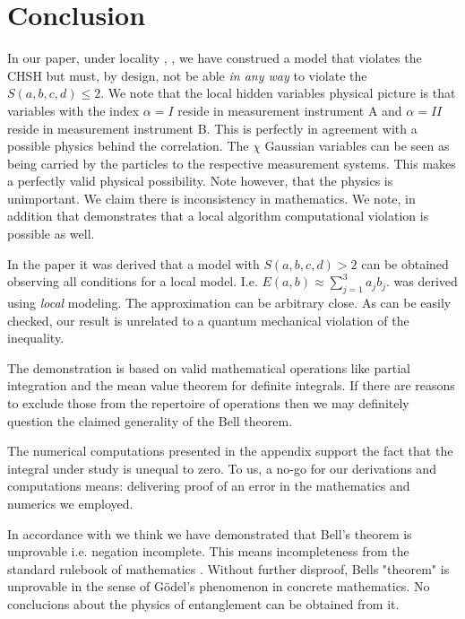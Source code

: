 \documentclass{appolb}
\begin{document}
\section{Conclusion}
In our paper, under locality \cite{2}, \cite{1}, we have construed a model that violates the CHSH but must, by design, not be able {\it in any way} to violate the $S(a,b,c,d)\leq 2$. 
We note that the local hidden variables physical picture is that variables with the index $\alpha=I$ reside in measurement instrument A and $\alpha=II$ reside in measurement instrument B. 
This is perfectly in agreement with a possible physics behind the correlation. 
The $\chi$ Gaussian variables can be seen as being carried by the particles to the respective measurement systems. This makes a perfectly valid physical possibility. 
Note however, that the physics is unimportant. 
We claim there is inconsistency in mathematics. 
We note, in addition that \cite{12} demonstrates that a local algorithm computational violation is possible as well.

In the paper it was derived that a model with $S(a,b,c,d) > 2$ can be obtained observing all conditions for a local model. I.e.
$
E(a,b)\approx \sum_{j=1}^3 a_j b_j.
$
was derived using {\it local} modeling. 
The approximation can be arbitrary close.
As can be easily checked, our result is unrelated to a quantum mechanical violation of the inequality. 

The demonstration is based on valid mathematical operations like partial integration and the mean value theorem for definite integrals. 
If there are reasons to exclude those from the repertoire of operations then we may definitely question the claimed generality of the Bell theorem. 

The numerical computations presented in the appendix support the fact that the integral under study is unequal to zero.
To us, a no-go for our derivations and computations means: delivering proof of an  error in the mathematics and numerics we employed.

In accordance with \cite{FriedLast} we think we have demonstrated that Bell's theorem is unprovable i.e. negation incomplete. 
This means incompleteness from the standard rulebook of mathematics \cite{FriedLect}. 
Without further disproof, Bells "theorem" is unprovable in the sense of G{\" o}del's phenomenon in concrete mathematics. No conclucions about the physics of entanglement can be obtained from it.
\end{document}
